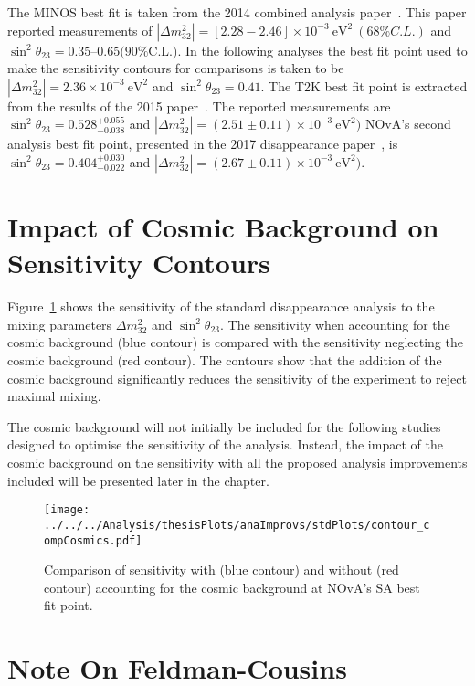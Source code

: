 The MINOS best fit is taken from the 2014 combined analysis
paper~\cite{adamson2014combined}. 
This paper reported measurements of 
$|\Delta m^2_{32}| = [2.28 - 2.46] \times 10^{-3}~\text{eV}^2~(68\%
C.L.)$ and $\sin^2\theta_{23} = 0.35–0.65 \text{(90\% C.L.)}$. 
In the following analyses the best fit point used to make
the sensitivity contours for comparisons is taken to be $|\Delta
m^2_{32}| = 2.36 \times10^{-3}~\text{eV}^2$ and $\sin^2\theta_{23} =
0.41$.  
The T2K best fit point is extracted from the results of the 2015
paper~\cite{abe2015measurements}. The reported measurements are
$\sin^2\theta_{23}=0.528^{+0.055}_{-0.038}$ and $|\Delta
m^2_{32}|=(2.51 \pm 0.11)\times10^{-3}~\text{eV}^2)$
NOvA's second analysis best fit point, presented in the 2017
disappearance paper~\cite{NOvASA}, is $\sin^2\theta_{23} =
0.404^{+0.030}_{-0.022}$ and $|\Delta m^2_{32}|=(2.67 \pm
0.11)\times10^{-3}~\text{eV}^2)$.  



\section{Impact of Cosmic Background on Sensitivity Contours}

Figure~\ref{fig:stdContourWithCosmics} shows the sensitivity of the
standard disappearance analysis to the mixing parameters $\Delta
m^2_{32}$ and $\sin^2\theta_{23}$. The sensitivity when accounting for
the cosmic background (blue contour) is compared with the sensitivity
neglecting the cosmic background (red contour). 
The contours show that the addition of the cosmic background
significantly reduces the sensitivity of the experiment to reject
maximal mixing.

The cosmic background will not initially be included for the following
studies designed to optimise the sensitivity of the analysis. 
Instead, the impact of the cosmic background on the sensitivity with
all the proposed analysis improvements included will be presented
later in the chapter.


\begin{figure}
  \centering
\texttt{[image: ../../../Analysis/thesisPlots/anaImprovs/stdPlots/contour\_compCosmics.pdf]}
  \caption{
    Comparison of sensitivity with (blue contour) and without (red
    contour) accounting for the cosmic background at NOvA's SA best fit
    point.
  } 
  \label{fig:stdContourWithCosmics}
\end{figure}


\section{Note On Feldman-Cousins}

